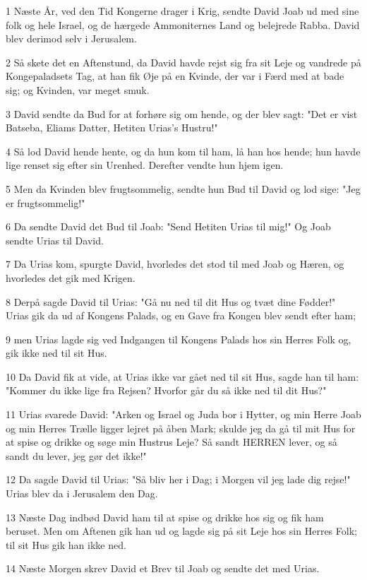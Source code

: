 \par 1 Næste År, ved den Tid Kongerne drager i Krig, sendte David Joab ud med sine folk og hele Israel, og de hærgede Ammoniternes Land og belejrede Rabba. David blev derimod selv i Jerusalem.
\par 2 Så skete det en Aftenstund, da David havde rejst sig fra sit Leje og vandrede på Kongepaladsets Tag, at han fik Øje på en Kvinde, der var i Færd med at bade sig; og Kvinden, var meget smuk.
\par 3 David sendte da Bud for at forhøre sig om hende, og der blev sagt: "Det er vist Batseba, Eliams Datter, Hetiten Urias's Hustru!"
\par 4 Så lod David hende hente, og da hun kom til ham, lå han hos hende; hun havde lige renset sig efter sin Urenhed. Derefter vendte hun hjem igen.
\par 5 Men da Kvinden blev frugtsommelig, sendte hun Bud til David og lod sige: "Jeg er frugtsommelig!"
\par 6 Da sendte David det Bud til Joab: "Send Hetiten Urias til mig!" Og Joab sendte Urias til David.
\par 7 Da Urias kom, spurgte David, hvorledes det stod til med Joab og Hæren, og hvorledes det gik med Krigen.
\par 8 Derpå sagde David til Urias: "Gå nu ned til dit Hus og tvæt dine Fødder!" Urias gik da ud af Kongens Palads, og en Gave fra Kongen blev sendt efter ham;
\par 9 men Urias lagde sig ved Indgangen til Kongens Palads hos sin Herres Folk og, gik ikke ned til sit Hus.
\par 10 Da David fik at vide, at Urias ikke var gået ned til sit Hus, sagde han til ham: "Kommer du ikke lige fra Rejsen? Hvorfor går du så ikke ned til dit Hus?"
\par 11 Urias svarede David: "Arken og Israel og Juda bor i Hytter, og min Herre Joab og min Herres Trælle ligger lejret på åben Mark; skulde jeg da gå til mit Hus for at spise og drikke og søge min Hustrus Leje? Så sandt HERREN lever, og så sandt du lever, jeg gør det ikke!"
\par 12 Da sagde David til Urias: "Så bliv her i Dag; i Morgen vil jeg lade dig rejse!" Urias blev da i Jerusalem den Dag.
\par 13 Næste Dag indbød David ham til at spise og drikke hos sig og fik ham beruset. Men om Aftenen gik han ud og lagde sig på sit Leje hos sin Herres Folk; til sit Hus gik han ikke ned.
\par 14 Næste Morgen skrev David et Brev til Joab og sendte det med Urias.
